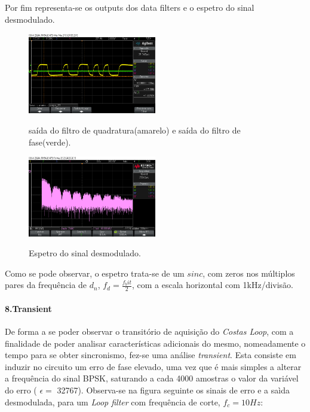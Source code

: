 \documentclass[11pt]{article}
\numberwithin{equation}{section}
\begin{document}
Por fim representa-se os outputs dos data filters e o espetro do sinal desmodulado.

\begin{figure}[H]
	\centering
	\includegraphics[width=0.5\textwidth]{./y1_y2n}~\\
	\caption{saída do filtro de quadratura(amarelo) e saída do filtro de fase(verde).}
	\label{y1_y2n}
\end{figure}

\begin{figure}[H]
	\centering
	\includegraphics[width=0.5\textwidth]{./espetro}~\\
	\caption{Espetro do sinal desmodulado.}
	\label{espetro}
\end{figure}

Como se pode observar, o espetro trata-se de um $sinc$, com zeros nos múltiplos pares da frequência de $d_n$, $f_d=\frac{f_bit}{2}$, com a escala horizontal com 1kHz/divisão.

\paragraph{8.Transient} \hspace{0pt} \label{para:P3-8}

De forma a se poder observar o transitório de aquisição do \textit{Costas Loop}, com a finalidade de poder analisar características adicionais do mesmo, nomeadamente o tempo para se obter sincronismo, fez-se uma análise \textit{transient}. Esta consiste em induzir no circuito um erro de fase elevado, uma vez que é mais simples a alterar a frequência do sinal BPSK, saturando a cada 4000 amostras o valor da variável do erro ( $\epsilon=$ 32767). Observa-se na figura seguinte os sinais de erro e a saìda desmodulada, para um \textit{Loop filter} com frequência de corte, $f_c = 10Hz$:
\end{document}
